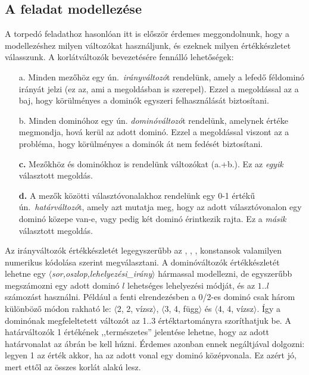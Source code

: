 \subsection{A feladat modellezése}

A torpedó feladathoz hasonlóan itt is először érdemes meggondolnunk, hogy a modellezéshez
milyen változókat használjunk, és ezeknek milyen értékkészletet válasszunk. A korlátváltozók
bevezetésére fennálló lehetőségek:

\begin{itemize}
\item[a.] Minden mezőhöz egy ún.\ \emph{irányváltozó}t rendelünk, amely a
    lefedő féldominó irányát jelzi (ez az, ami a megoldásban is szerepel).
    Ezzel a megoldással az a baj, hogy körülményes a dominók egyszeri
    felhasználását biztosítani.
\item[b.] Minden dominóhoz egy ún. \emph{dominóváltozó}t rendelünk,
    amelynek értéke megmondja, hová kerül az adott dominó. Ezzel a megoldással
    viszont az a probléma, hogy körülményes a dominók át nem fedését biztosítani.
\item[{\bf c.}] Mezőkhöz és dominókhoz is rendelünk változókat (a.+b.). Ez az
    \emph{egyik} választott megoldás.
\item[{\bf d.}] A mezők közötti választóvonalakhoz rendelünk egy 0-1 értékű ún.\
\emph{határváltozó}t, amely azt mutatja meg, hogy az adott választóvonalon egy
dominó közepe van-e, vagy pedig két dominó érintkezik rajta. Ez a \emph{másik}
    választott megoldás.
\end{itemize}

Az irányváltozók értékkészletét legegyszerűbb az , , , 
konstansok valamilyen numerikus kódolása szerint megválasztani. A dominóváltozók
értékkészletét lehetne egy $\langle${\em sor,oszlop,lehelyezési\_irány}$\rangle$
hármassal modellezni, de egyszerűbb megszámozni egy adott dominó $l$ lehetséges
lehelyezési módját, és az $1..l$ számozást használni. Például a fenti elrendezésben
a 0/2-es dominó csak három különböző módon rakható le: $\langle$2, 2, vízsz$\rangle$,
$\langle$3, 4, függ$\rangle$ és $\langle$4, 4, vízsz$\rangle$. Így a dominónak
megfeleltetett változót az 1..3 értéktartományra szoríthatjuk be. A határváltozók
1 értékének ,,természetes'' jelentése lehetne, hogy az adott határvonalat az ábrán
be kell húzni. Érdemes azonban ennek negáltjával dolgozni: legyen 1 az érték akkor,
ha az adott vonal egy dominó középvonala. Ez azért jó, mert ettől az összes korlát
\cd{A+B+... \#= 1} alakú lesz.

